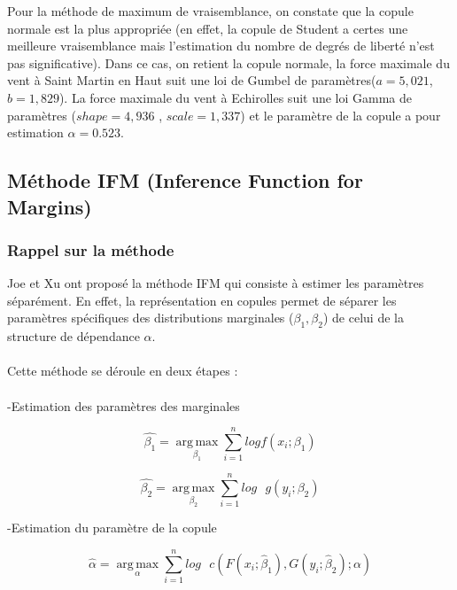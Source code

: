 Pour la méthode de maximum de vraisemblance, on constate que la copule normale est la plus appropriée (en effet, la copule de Student a certes une meilleure vraisemblance mais l'estimation du nombre de degrés de liberté n'est pas significative). Dans ce cas, on retient la copule normale, la force maximale du vent à Saint Martin en Haut suit une loi de Gumbel de paramètres($a = 5,021$, $b=1,829 $). La force maximale du vent à Echirolles suit une loi Gamma de paramètres ($shape = 4,936$ , $scale=1,337$) et le paramètre de la copule a pour estimation $\alpha=0.523$.

\subsection{Méthode IFM (Inference Function for Margins)}

\subsubsection{Rappel sur la méthode}

Joe et Xu ont proposé la méthode IFM qui consiste à estimer les paramètres séparément. En effet, la représentation en copules permet de séparer les paramètres spécifiques des distributions marginales ($\beta_1,\beta_2$) de celui de la structure de dépendance $\alpha$.
\\ \\
Cette méthode se déroule en deux étapes :
\\ \\
\text{   } \hspace{0.2cm} -Estimation des paramètres des marginales
 
\begin{equation*}
\hat{\beta_1} = \underset{\beta_1}{\operatorname{arg\,max}} \sum_{i=1}^n log f(x_i;\beta_1)
\end{equation*}

\begin{equation*}
\hat{\beta_2} = \underset{\beta_2}{\operatorname{arg\,max}} \sum_{i=1}^n log \text{ }g(y_i;\beta_2)
\end{equation*}

-Estimation du paramètre de la copule

\begin{equation*}
\hat{\alpha} = \underset{\alpha}{\operatorname{arg\,max}} \sum_{i=1}^n log \text{ }c\left(F(x_i;\hat{\beta}_1),G(y_i;\hat{\beta}_2);\alpha\right)
\end{equation*}

